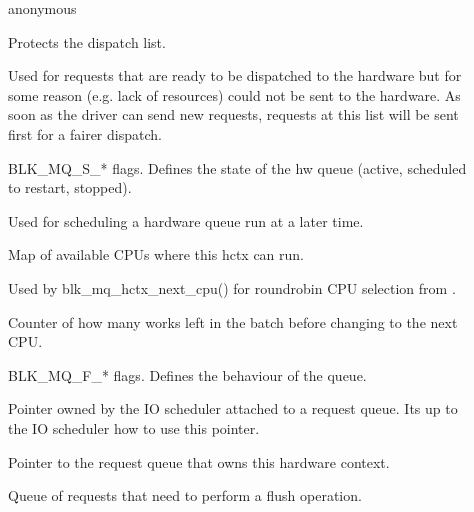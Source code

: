 \documentclass[a4paper,11pt,english]{sphinxmanual}
\begin{document}
\begin{description}
\item[{}] \leavevmode
anonymous

\item[{}] \leavevmode
Protects the dispatch list.

\item[{}] \leavevmode
Used for requests that are ready to be
dispatched to the hardware but for some reason (e.g. lack of
resources) could not be sent to the hardware. As soon as the
driver can send new requests, requests at this list will
be sent first for a fairer dispatch.

\item[{}] \leavevmode
BLK\_MQ\_S\_* flags. Defines the state of the hw
queue (active, scheduled to restart, stopped).

\item[{}] \leavevmode
Used for scheduling a hardware queue run at a later time.

\item[{}] \leavevmode
Map of available CPUs where this hctx can run.

\item[{}] \leavevmode
Used by blk\_mq\_hctx\_next\_cpu() for round\sphinxhyphen{}robin CPU
selection from .

\item[{}] \leavevmode
Counter of how many works left in the batch before
changing to the next CPU.

\item[{}] \leavevmode
BLK\_MQ\_F\_* flags. Defines the behaviour of the queue.

\item[{}] \leavevmode
Pointer owned by the IO scheduler attached to a request
queue. It\textquotesingle{}s up to the IO scheduler how to use this pointer.

\item[{}] \leavevmode
Pointer to the request queue that owns this hardware context.

\item[{}] \leavevmode
Queue of requests that need to perform a flush operation.


\end{description}
\end{document}
